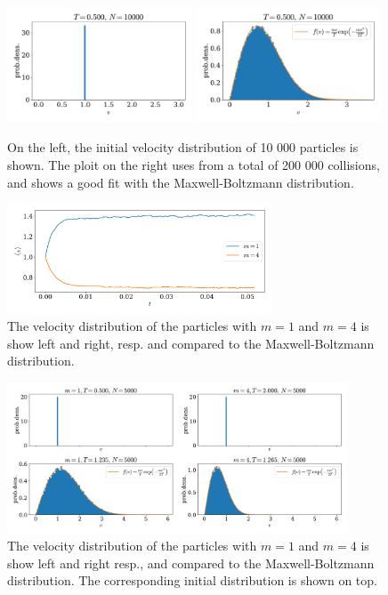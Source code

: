 \documentclass{article}
\begin{document}
    \begin{figure}[H]
        \centering
        \includegraphics[width=0.49\textwidth]{../plots/problem1/2/vel_dist.pdf}
        \includegraphics[width=0.49\textwidth]{../plots/problem1/vel_dist.pdf}
        \caption{On the left, the initial velocity distribution of 10 000 particles is shown. The ploit on the right uses from a total of 200 000 collisions, and shows a good fit with the Maxwell-Boltzmann distribution.}
        \label{problem1 dist}
    \end{figure}
    \begin{figure}[H]
        \centering
        \includegraphics[width=0.7\textwidth]{../plots/problem2/v_av.pdf}
        \caption{The velocity distribution of the particles with $m=1$ and $m=4$ is show left and right, resp.
        and compared to the Maxwell-Boltzmann distribution.}
        \label{problem2 av vel}
    \end{figure}
    \begin{figure}[H]
        \centering
        \includegraphics[width=0.9\textwidth]{../plots/problem2/vel_dist.pdf}
        \caption{The velocity distribution of the particles with $m=1$ and $m=4$ is show left and right resp.,
        and compared to the Maxwell-Boltzmann distribution. The corresponding initial distribution is shown on top.}
        \label{problem2 dist}
    \end{figure}
 
\end{document}
